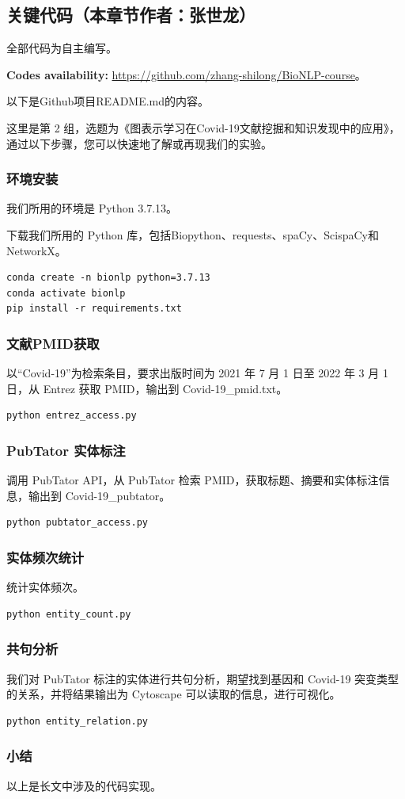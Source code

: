 \documentclass[twocolumn]{article}
\begin{document}
\subsection{关键代码（本章节作者：张世龙）}

全部代码为自主编写。\par
{\bf Codes availability:} \url{https://github.com/zhang-shilong/BioNLP-course}。\par
以下是Github项目README.md的内容。\par
这里是第 2 组，选题为《图表示学习在Covid-19文献挖掘和知识发现中的应用》，通过以下步骤，您可以快速地了解或再现我们的实验。\par
\subsubsection{环境安装}
我们所用的环境是 Python 3.7.13。\par
下载我们所用的 Python 库，包括Biopython、requests、spaCy、ScispaCy和NetworkX。\par
\begin{lstlisting}
conda create -n bionlp python=3.7.13
conda activate bionlp
pip install -r requirements.txt
\end{lstlisting}
\subsubsection{文献PMID获取}
以“Covid-19”为检索条目，要求出版时间为 2021 年 7 月 1 日至 2022 年 3 月 1 日，从 Entrez 获取 PMID，输出到 Covid-19\_pmid.txt。
\begin{lstlisting}
python entrez_access.py
\end{lstlisting}
\subsubsection{PubTator 实体标注}
调用 PubTator API，从 PubTator 检索 PMID，获取标题、摘要和实体标注信息，输出到 Covid-19\_pubtator。
\begin{lstlisting}
python pubtator_access.py
\end{lstlisting}
\subsubsection{实体频次统计}
统计实体频次。
\begin{lstlisting}
python entity_count.py
\end{lstlisting}
\subsubsection{共句分析}
我们对 PubTator 标注的实体进行共句分析，期望找到基因和 Covid-19 突变类型的关系，并将结果输出为 Cytoscape 可以读取的信息，进行可视化。
\begin{lstlisting}
python entity_relation.py
\end{lstlisting}
\subsubsection{小结}
以上是长文中涉及的代码实现。
\end{document}
